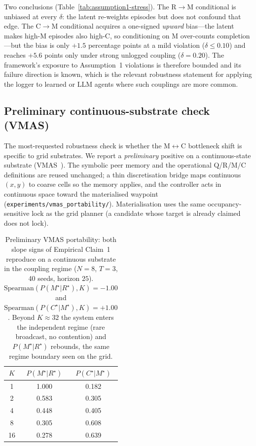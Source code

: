 \documentclass{article}
\newcommand{\method}[1]{\texttt{#1}}
\begin{document}
Two conclusions (Table~\ref{tab:assumption1-stress}). The R$\to$M conditional is unbiased at every $\delta$: the latent re-weights episodes but does not confound that edge. The C$\to$M conditional acquires a one-signed \emph{upward} bias---the latent makes high-M episodes also high-C, so conditioning on M over-counts completion---but the bias is only $+1.5$ percentage points at a mild violation ($\delta\!\le\!0.10$) and reaches $+5.6$ points only under strong unlogged coupling ($\delta{=}0.20$). The framework's exposure to Assumption~1 violations is therefore bounded and its failure direction is known, which is the relevant robustness statement for applying the logger to learned or LLM agents where such couplings are more common.

\subsection{Preliminary continuous-substrate check (VMAS)}
\label{app:vmas}

The most-requested robustness check is whether the M$\leftrightarrow$C
bottleneck shift is specific to grid substrates. We report a \emph{preliminary}
positive on a continuous-state substrate (VMAS~\citep{bettini2022vmas}). The
symbolic peer memory and the operational Q/R/M/C definitions are reused
unchanged; a thin discretisation bridge maps continuous $(x,y)$ to coarse cells
so the memory applies, and the controller acts in continuous space toward the
materialised waypoint (\method{experiments/vmas\_portability/}). Materialisation
uses the same occupancy-sensitive lock as the grid planner (a candidate whose
target is already claimed does not lock).

\begin{table}[h]
\caption{Preliminary VMAS portability: both slope signs of Empirical Claim~1 reproduce on a continuous substrate in the coupling regime ($N{=}8$, $T{=}3$, 40 seeds, horizon $25$). $\mathrm{Spearman}(P(M^\star|R^\star),K){=}-1.00$ and $\mathrm{Spearman}(P(C^\star|M^\star),K){=}+1.00$. Beyond $K\!\approx\!32$ the system enters the independent regime (rare broadcast, no contention) and $P(M^\star|R^\star)$ rebounds, the same regime boundary seen on the grid.}
\label{tab:vmas}
\centering
\small
\begin{tabular}{c c c}
\toprule
$K$ & $P(M^\star|R^\star)$ & $P(C^\star|M^\star)$ \\
\midrule
1  & 1.000 & 0.182 \\
2  & 0.583 & 0.305 \\
4  & 0.448 & 0.405 \\
8  & 0.305 & 0.608 \\
16 & 0.278 & 0.639 \\
\bottomrule
\end{tabular}
\end{table}
\end{document}
